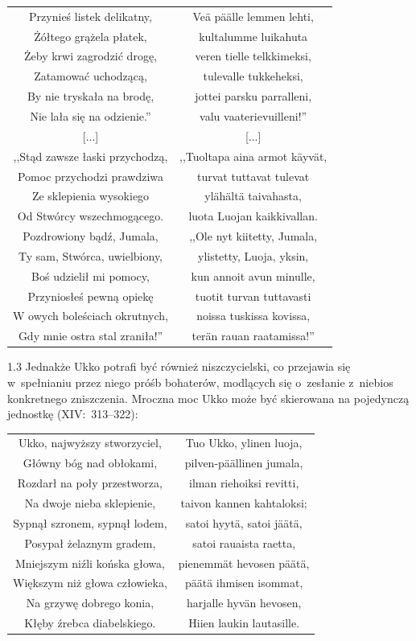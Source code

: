 \documentclass[11pt,a4paper,twoside]{report}
\begin{document}
{\begin{longtable}{c c}
Przynieś listek delikatny, & Veä päälle lemmen lehti, \\
Żółtego grążela płatek, & kultalumme luikahuta \\
Żeby krwi zagrodzić drogę, & veren tielle telkkimeksi, \\
Zatamować uchodzącą, & tulevalle tukkeheksi, \\
By nie tryskała na brodę, & jottei parsku parralleni, \\
Nie lała się na odzienie.'' & valu vaaterievuilleni!'' \\
{[...]} & {[...]}\\
,,Stąd zawsze łaski przychodzą, & ,,Tuoltapa aina armot käyvät, \\
Pomoc przychodzi prawdziwa & turvat tuttavat tulevat  \\
Ze sklepienia wysokiego & ylähältä taivahasta,  \\
Od Stwórcy wszechmogącego. & luota Luojan kaikkivallan.  \\
Pozdrowiony bądź, Jumala, & ,,Ole nyt kiitetty, Jumala,  \\
Ty sam, Stwórca, uwielbiony, & ylistetty, Luoja, yksin,  \\
Boś udzielił mi pomocy, & kun annoit avun minulle,  \\
Przyniosłeś pewną opiekę & tuotit turvan tuttavasti  \\
W owych boleściach okrutnych, & noissa tuskissa kovissa,  \\
Gdy mnie ostra stal zraniła!'' & terän rauan raatamissa!''  \\
\end{longtable}
}
\begin{spacing}{1.3}
Jednakże Ukko potrafi być również niszczycielski, co przejawia się w~spełnianiu przez niego próśb bohaterów, modlących się o~zesłanie z~niebios konkretnego zniszczenia. Mroczna moc Ukko może być skierowana na pojedynczą jednostkę (XIV:~313--322):
\end{spacing}
{\centering
\small
\begin{longtable}{c c}
Ukko, najwyższy stworzyciel, & Tuo Ukko, ylinen luoja, \\
Główny bóg nad obłokami, & pilven-päällinen jumala, \\
Rozdarł na poły przestworza, & ilman riehoiksi revitti, \\
Na dwoje nieba sklepienie, & taivon kannen kahtaloksi; \\
Sypnął szronem, sypnął lodem, & satoi hyytä, satoi jäätä, \\
Posypał żelaznym gradem, & satoi rauaista raetta, \\
Mniejszym niźli końska głowa, & pienemmät hevosen päätä, \\
Większym niż głowa człowieka, & päätä ihmisen isommat, \\
Na grzywę dobrego konia, & harjalle hyvän hevosen, \\
Kłęby źrebca diabelskiego. & Hiien laukin lautasille. \\
\end{longtable}
}
\end{document}
